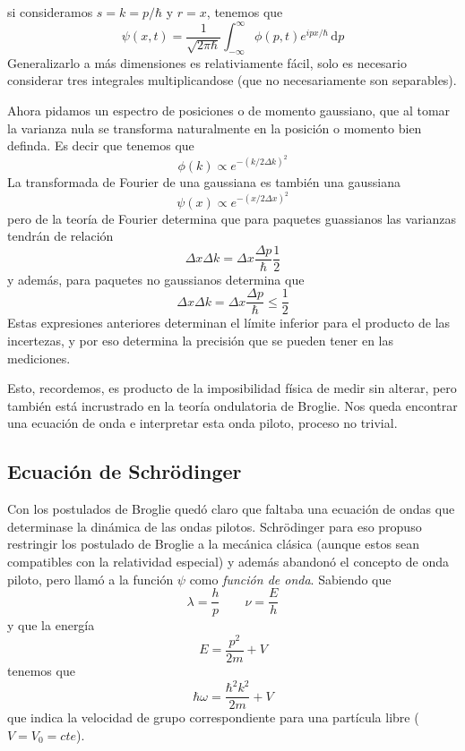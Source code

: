 si consideramos $s = k = p/\hbar$ y $r = x$, tenemos que
\begin{equation}
    \psi(x, t) = \frac{1}{\sqrt{2 \pi \hbar}} \int_{-\infty}^{\infty} \phi(p, t) e^{i p x/\hbar}\, \mathrm{d}p
\end{equation}
Generalizarlo a más dimensiones es relativiamente fácil, solo es necesario considerar tres integrales multiplicandose (que no necesariamente son separables).

Ahora pidamos un espectro de posiciones o de momento gaussiano, que al tomar la varianza nula se transforma naturalmente en la posición o momento bien definda.
Es decir que tenemos que
\[ \phi(k) \propto e^{-\left(k/2\Delta k\right)^2} \]
La transformada de Fourier de una gaussiana es también una gaussiana
\[ \psi(x) \propto e^{-\left(x/2\Delta x\right)^2}\]
pero de la teoría de Fourier determina que para paquetes guassianos las varianzas tendrán de relación
\begin{equation}
    \Delta x \Delta k = \Delta x \frac{\Delta p}{\hbar} \frac{1}{2}
\end{equation}
y además, para paquetes no gaussianos determina que
\begin{equation}
    \Delta x \Delta k = \Delta x \frac{\Delta p}{\hbar} \leq \frac{1}{2}
\end{equation}
Estas expresiones anteriores determinan el límite inferior para el producto de las incertezas, y por eso determina la precisión que se pueden tener en las mediciones.

Esto, recordemos, es producto de la imposibilidad física de medir sin alterar, pero también está incrustrado en la teoría ondulatoria de Broglie.
Nos queda encontrar una ecuación de onda e interpretar esta onda piloto, proceso no trivial.

\subsection{Ecuación de Schrödinger}
Con los postulados de Broglie quedó claro que faltaba una ecuación de ondas que determinase la dinámica de las ondas pilotos.
Schrödinger para eso propuso restringir los postulado de Broglie a la mecánica clásica (aunque estos sean compatibles con la relatividad especial) y además abandonó el concepto de onda piloto, pero llamó a la función $\psi$ como \emph{función de onda}.
Sabiendo que 
\[ \lambda = \frac{h}{p} \qquad \nu = \frac{E}{h}\]
y que la energía
\[ E = \frac{p^2}{2m} + V \]
tenemos que
\[\hbar \omega = \frac{\hbar^2 k^2}{2 m } + V\]
que indica la velocidad de grupo correspondiente para una partícula libre ($V = V_0 = cte$).

